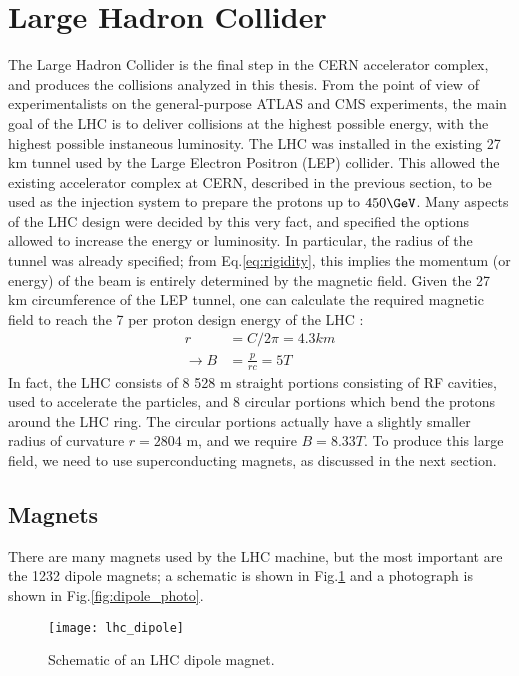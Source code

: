 \section{Large Hadron Collider}

The Large Hadron Collider is the final step in the CERN accelerator complex, and produces the collisions analyzed in this thesis.
From the point of view of experimentalists on the general-purpose ATLAS and CMS experiments, the main goal of the LHC is to deliver collisions at the highest possible energy, with the highest possible instaneous luminosity.
The LHC was installed in the existing 27 km tunnel used by the Large Electron Positron (LEP) collider.
This allowed the existing accelerator complex at CERN, described in the previous section, to be used as the injection system to prepare the protons up to $450 \GeV$.
Many aspects of the LHC design were decided by this very fact, and specified the options allowed to increase the energy or luminosity.
In particular, the radius of the tunnel was already specified; from Eq.\ref{eq:rigidity}, this implies the momentum (or energy) of the beam is entirely determined by the magnetic field.
Given the 27 km circumference of the LEP tunnel, one can calculate the required magnetic field to reach the 7 \TeV per proton design energy of the LHC :
\begin{align}
r &= C / 2\pi = 4.3 km \\
\rightarrow B &= \frac{p}{rc} = 5 T
\end{align}
In fact, the LHC consists of 8 528 m straight portions consisting of RF cavities, used to accelerate the particles, and 8 circular portions which bend the protons around the LHC ring.
The circular portions actually have a slightly smaller radius of curvature $r = 2804 $ m, and we require $B = 8.33 T$.
To produce this large field, we need to use superconducting magnets, as discussed in the next section.

\subsection{Magnets}

There are many magnets used by the LHC machine, but the most important are the 1232 dipole magnets; a schematic is shown in Fig.\ref{fig:dipole_schematic} and a photograph is shown in Fig.\ref{fig:dipole_photo}.
\begin{figure}
\caption{Schematic of an LHC dipole magnet.}\label{fig:dipole_schematic}
\texttt{[image: lhc\_dipole]}
\end{figure}

